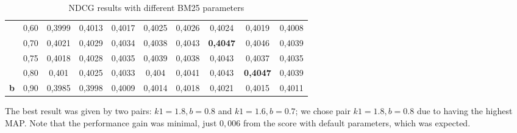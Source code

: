 \begin{table}[!h]
\begin{tabular}{|cc|cccccccc|}
\multicolumn{1}{|c|}{}                             & 0,60                      & \multicolumn{1}{c|}{\cellcolor[HTML]{F9C366}0,3999} & \multicolumn{1}{c|}{\cellcolor[HTML]{FED766}0,4013} & \multicolumn{1}{c|}{\cellcolor[HTML]{F2D564}0,4017} & \multicolumn{1}{c|}{\cellcolor[HTML]{CEC95F}0,4025} & \multicolumn{1}{c|}{\cellcolor[HTML]{C9C85E}0,4026} & \multicolumn{1}{c|}{\cellcolor[HTML]{D2CB60}0,4024}          & \multicolumn{1}{c|}{\cellcolor[HTML]{E9D263}0,4019}          & \cellcolor[HTML]{FCD066}0,4008 \\ %
\multicolumn{1}{|c|}{}                             & 0,70                      & \multicolumn{1}{c|}{\cellcolor[HTML]{E0CF62}0,4021} & \multicolumn{1}{c|}{\cellcolor[HTML]{BCC35C}0,4029} & \multicolumn{1}{c|}{\cellcolor[HTML]{A5BC59}0,4034} & \multicolumn{1}{c|}{\cellcolor[HTML]{93B656}0,4038} & \multicolumn{1}{c|}{\cellcolor[HTML]{7DAE52}0,4043} & \multicolumn{1}{c|}{\cellcolor[HTML]{6AA84F}\textbf{0,4047}} & \multicolumn{1}{c|}{\cellcolor[HTML]{6FAA50}0,4046}          & \cellcolor[HTML]{8FB455}0,4039 \\ %
\multicolumn{1}{|c|}{}                             & 0,75                     & \multicolumn{1}{c|}{\cellcolor[HTML]{EDD464}0,4018} & \multicolumn{1}{c|}{\cellcolor[HTML]{C0C55D}0,4028} & \multicolumn{1}{c|}{\cellcolor[HTML]{A1BA58}0,4035} & \multicolumn{1}{c|}{\cellcolor[HTML]{8FB455}0,4039} & \multicolumn{1}{c|}{\cellcolor[HTML]{93B656}0,4038} & \multicolumn{1}{c|}{\cellcolor[HTML]{7DAE52}0,4043}          & \multicolumn{1}{c|}{\cellcolor[HTML]{98B756}0,4037}          & \cellcolor[HTML]{A1BA58}0,4035 \\ %
\multicolumn{1}{|c|}{}                             & 0,80 & \multicolumn{1}{c|}{\cellcolor[HTML]{FDD366}0,401}  & \multicolumn{1}{c|}{\cellcolor[HTML]{CEC95F}0,4025} & \multicolumn{1}{c|}{\cellcolor[HTML]{AABD59}0,4033} & \multicolumn{1}{c|}{\cellcolor[HTML]{8AB354}0,404}  & \multicolumn{1}{c|}{\cellcolor[HTML]{86B154}0,4041} & \multicolumn{1}{c|}{\cellcolor[HTML]{7DAE52}0,4043}          & \multicolumn{1}{c|}{\cellcolor[HTML]{6AA84F}\textbf{0,4047}} & \cellcolor[HTML]{8FB455}0,4039 \\ %
\multicolumn{1}{|c|}{\multirow{-8}{*}{\textbf{b}}} & 0,90 & \multicolumn{1}{c|}{\cellcolor[HTML]{F3AF66}0,3985} & \multicolumn{1}{c|}{\cellcolor[HTML]{F8C266}0,3998} & \multicolumn{1}{c|}{\cellcolor[HTML]{FDD166}0,4009} & \multicolumn{1}{c|}{\cellcolor[HTML]{FFD966}0,4014} & \multicolumn{1}{c|}{\cellcolor[HTML]{EDD464}0,4018} & \multicolumn{1}{c|}{\cellcolor[HTML]{E0CF62}0,4021}          & \multicolumn{1}{c|}{\cellcolor[HTML]{FBD866}0,4015}          & \cellcolor[HTML]{FDD466}0,4011 \\
\bottomrule
\end{tabular}
\caption{\label{tab:BM25} NDCG results with different BM25 parameters}
\end{table}
The best result was given by two pairs: $k1=1.8, b=0.8$ and $k1=1.6, b=0.7$; we chose pair $k1=1.8, b=0.8$ due to having the highest \ac{MAP}.  Note that the performance gain was minimal, just $0,006$ from the score with default parameters, which was expected.